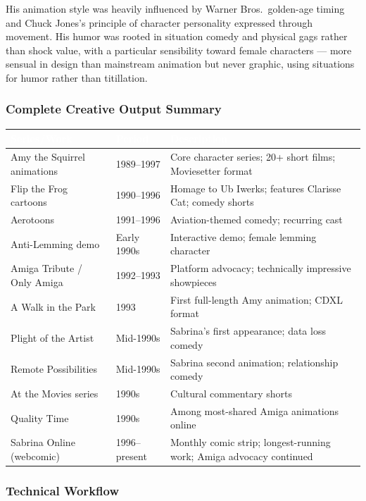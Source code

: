 \documentclass[11pt,letterpaper]{article}
\newcommand{\tableheader}[1]{\textbf{\sffamily\textcolor{white}{#1}}}
\begin{document}
His animation style was heavily influenced by Warner Bros.\ golden-age timing and Chuck Jones's principle of character personality expressed through movement. His humor was rooted in situation comedy and physical gags rather than shock value, with a particular sensibility toward female characters --- more sensual in design than mainstream animation but never graphic, using situations for humor rather than titillation.

\subsubsection{Complete Creative Output Summary}

\begin{center}
\begin{tabularx}{\textwidth}{L{4cm}L{2cm}X}
\toprule
{}
\tableheader{Series/Work} & \tableheader{Period} & \tableheader{Description} \\
\midrule
Amy the Squirrel animations & 1989--1997 & Core character series; 20+ short films; Moviesetter format \\
Flip the Frog cartoons & 1990--1996 & Homage to Ub Iwerks; features Clarisse Cat; comedy shorts \\
Aerotoons & 1991--1996 & Aviation-themed comedy; recurring cast \\
Anti-Lemming demo & Early 1990s & Interactive demo; female lemming character \\
Amiga Tribute / Only Amiga & 1992--1993 & Platform advocacy; technically impressive showpieces \\
A Walk in the Park & 1993 & First full-length Amy animation; CDXL format \\
Plight of the Artist & Mid-1990s & Sabrina's first appearance; data loss comedy \\
Remote Possibilities & Mid-1990s & Sabrina second animation; relationship comedy \\
At the Movies series & 1990s & Cultural commentary shorts \\
Quality Time & 1990s & Among most-shared Amiga animations online \\
Sabrina Online (webcomic) & 1996--present & Monthly comic strip; longest-running work; Amiga advocacy continued \\
\bottomrule
\end{tabularx}
\end{center}

\subsubsection{Technical Workflow}
\end{document}
